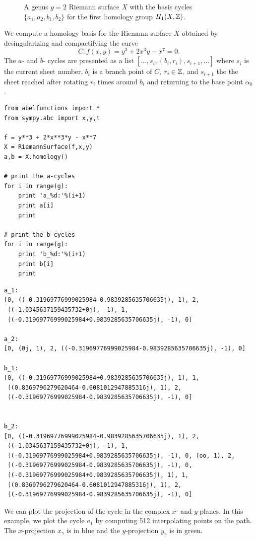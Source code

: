 \begin{figure}
  \caption{A genus $g=2$ Riemann surface $X$ with the basis cycles
    $\{a_1,a_2,b_1,b_2\}$ for the first homology group $H_1(X,\operatorname{\mathbb{Z}})$.}
  \label{fig: cycle-basis}
\end{figure}


We compute a homology basis for the Riemann surface $X$ obtained by
desingularizing and compactifying the curve
\[
  C : f(x,y) = y^3 + 2x^3y - x^7 = 0.
\]
The $a$- and $b$- cycles are presented as a list $[\ldots, s_i,(b_i,r_i),
s_{i+1}, \ldots]$ where $s_i$ is the current sheet number, $b_i$ is a branch
point of $C$, $r_i \in \operatorname{\mathbb{Z}}$, and $s_{i+1}$ the the sheet reached after rotating
$r_i$ times around $b_i$ and returning to the base point $\alpha_0$.
\begin{lstlisting}
from abelfunctions import *
from sympy.abc import x,y,t

f = y**3 + 2*x**3*y - x**7
X = RiemannSurface(f,x,y)
a,b = X.homology()

# print the a-cycles
for i in range(g):
    print 'a_%d:'%(i+1)
    print a[i]
    print

# print the b-cycles
for i in range(g):
    print 'b_%d:'%(i+1)
    print b[i]
    print
\end{lstlisting}
\begin{lstlisting}
a_1:
[0, ((-0.31969776999025984-0.9839285635706635j), 1), 2,
 ((-1.0345637159435732+0j), -1), 1,
 ((-0.31969776999025984+0.9839285635706635j), -1), 0]

a_2:
[0, (0j, 1), 2, ((-0.31969776999025984-0.9839285635706635j), -1), 0]

b_1:
[0, ((-0.31969776999025984+0.9839285635706635j), 1), 1,
 ((0.8369796279620464-0.6081012947885316j), 1), 2,
 ((-0.31969776999025984-0.9839285635706635j), -1), 0]


b_2:
[0, ((-0.31969776999025984-0.9839285635706635j), 1), 2,
 ((-1.0345637159435732+0j), -1), 1,
 ((-0.31969776999025984+0.9839285635706635j), -1), 0, (oo, 1), 2,
 ((-0.31969776999025984-0.9839285635706635j), -1), 0,
 ((-0.31969776999025984+0.9839285635706635j), 1), 1,
 ((0.8369796279620464-0.6081012947885316j), 1), 2,
 ((-0.31969776999025984-0.9839285635706635j), -1), 0]
\end{lstlisting}

We can plot the projection of the cycle in the complex $x$- and $y$-planes. In
this example, we plot the cycle $a_1$ by computing 512 interpolating points on
the path. The $x$-projection $x_\gamma$ is in blue and the $y$-projection
$y_\gamma$ is in green.

